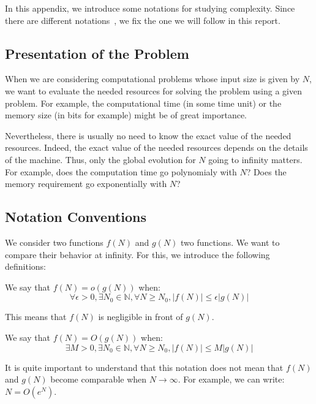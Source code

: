 In this appendix, we introduce some notations for studying complexity. Since there are different notations~\cite{knuth, wiki-complexity}, we fix the one we will follow in this report.

\subsection{Presentation of the Problem}
When we are considering computational problems whose input size is given by $N$, we want to evaluate the needed resources for solving the problem using a given problem. For example, the computational time (in some time unit) or the memory size (in bits for example) might be of great importance.

Nevertheless, there is usually no need to know the exact value of the needed resources. Indeed, the exact value of the needed resources depends on the details of the machine. Thus, only the global evolution for $N$ going to infinity matters. For example, does the computation time go polynomialy with $N$? Does the memory requirement go exponentially with $N$?

\subsection{Notation Conventions}
We consider two functions $f(N)$ and $g(N)$ two functions. We want to compare their behavior at infinity. For this, we introduce the following definitions:

\begin{definition}[$o$ Notation]
    We say that $f(N) = o(g(N))$ when:
\begin{equation}
    \forall \epsilon > 0, \exists N_0 \in \mathbb{N}, \forall N \ge N_0, |f(N)| \le \epsilon |g(N)|
\end{equation}
\end{definition}

This means that $f(N)$ is negligible in front of $g(N)$.

\begin{definition}[$O$ Notation]
We say that $f(N) = O(g(N))$ when:
\begin{equation}
    \exists M > 0, \exists N_0 \in \mathbb{N}, \forall N \ge N_0, |f(N)| \le M |g(N)|
\end{equation}
\end{definition}

\begin{remark}
    It is quite important to understand that this notation does not mean that $f(N)$ and $g(N)$ become comparable when $N \rightarrow \infty$. For example, we can write: $N = O(e^N)$.
\end{remark}

